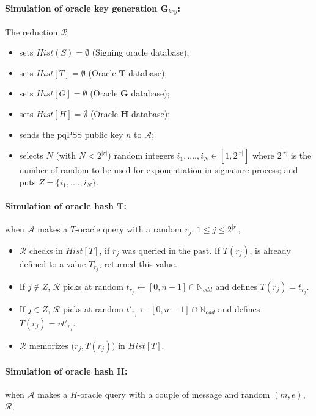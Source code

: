 \documentclass[a4paper,11pt]{article}
\begin{document}
\paragraph{Simulation of oracle key generation $\mathbf{G}_{key}$:} The reduction $\mathcal{R}$

\begin{itemize}
\item sets $Hist(S)=\emptyset$ (Signing oracle database);
\item sets $Hist [T] = \emptyset $ (Oracle $\mathbf{T}$ database);
\item sets $Hist [G] = \emptyset $ (Oracle $\mathbf{G}$ database);
\item sets $Hist [H] = \emptyset $ (Oracle $\mathbf{H}$ database);
\item sends the pqPSS public key $n$ to $\mathcal{A}$;
\item selects $N$ (with $N<2^{|r|}$) random integers  $i_{1},...., i_{N} \in [1, 2^{|r|}]$ where $2^{|r|}$ is the number
 of random to be used for exponentiation in signature process; and puts $Z=\{i_{1},...., i_{N}\}$.
\end{itemize}

\paragraph{Simulation of oracle hash $\mathbf{T}$:} when $\mathcal{A}$ makes a $T$-oracle query with a random  $r_{j}$, $1\leq j\leq 2^{|r|}$,

\begin{itemize}
 \item    $\mathcal{R}$ checks in $Hist [T]$, if $r_{j}$ was queried in the past. If $T(r_{j})$, is already defined to a value $T_{r_{j}}$,  returned this value.
   \item If $j \notin Z$, $\mathcal{R}$ picks  at random  $t_{r_{j}} \leftarrow [0, n-1]\cap \mathbb{N}_{odd}$ and defines $T(r_{j})=t_{r_{j}}$.
   \item  If $j \in Z$,  $\mathcal{R}$ picks  at random  $ t'_{r_{j}} \leftarrow [0, n-1]\cap \mathbb{N}_{odd}$ and defines $T(r_{j})=vt'_{r_{j}}$.
 \item  $\mathcal{R}$   memorizes $\big(r_{j}, T(r_{j})\big)$ in $Hist [T]$.
\end{itemize}


\paragraph{Simulation of oracle hash $\mathbf{H}$:} when $\mathcal{A}$ makes a $H$-oracle query with a couple of message and random  $(m,e)$, \ $\mathcal{R}$,
\end{document}
